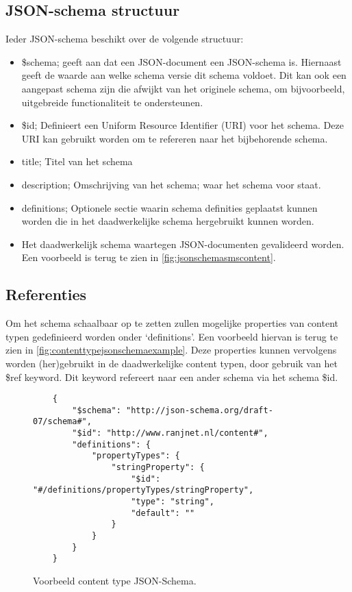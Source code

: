\subsection{JSON-schema structuur}
Ieder JSON-schema beschikt over de volgende structuur:
\begin{itemize}
    \item \$schema; geeft aan dat een JSON-document een JSON-schema is. Hiernaast geeft de waarde aan welke schema versie dit schema voldoet\cite{Droettboom2016}. Dit kan ook een aangepast schema zijn die afwijkt van het originele schema, om bijvoorbeeld, uitgebreide functionaliteit te ondersteunen.
    \item \$id; Definieert een Uniform Resource Identifier (URI) voor het schema. Deze URI kan gebruikt worden om te refereren naar het bijbehorende schema.
    \item title; Titel van het schema
    \item description; Omschrijving van het schema; waar het schema voor staat.
    \item definitions; Optionele sectie waarin schema definities geplaatst kunnen worden die in het daadwerkelijke schema hergebruikt kunnen worden\cite{FoundationsJSONSchema}.
    \item Het daadwerkelijk schema waartegen JSON-documenten gevalideerd worden. Een voorbeeld is terug te zien in \autoref{fig:jsonschemasmscontent}.
\end{itemize}

\subsection{Referenties}
Om het schema schaalbaar op te zetten zullen mogelijke properties van content typen gedefinieerd worden onder ‘definitions’. Een voorbeeld hiervan is terug te zien in \autoref{fig:contenttypejsonschemaexample}. Deze properties kunnen vervolgens worden (her)gebruikt in de daadwerkelijke content typen, door gebruik van het \$ref keyword\cite{Droettboom2016}. Dit keyword refereert naar een ander schema via het schema \$id.

\begin{figure}[H]
    \centering
    \lstset{language=JSON}
    \begin{lstlisting}
    {
        "$schema": "http://json-schema.org/draft-07/schema#",
        "$id": "http://www.ranjnet.nl/content#",
        "definitions": {
            "propertyTypes": {
                "stringProperty": {
                    "$id": "#/definitions/propertyTypes/stringProperty",
                    "type": "string",
                    "default": ""
                }
            }
        }
    }                            
    \end{lstlisting}
    \caption{Voorbeeld content type JSON-Schema.}
    \label{fig:contenttypejsonschemaexample}
\end{figure}

